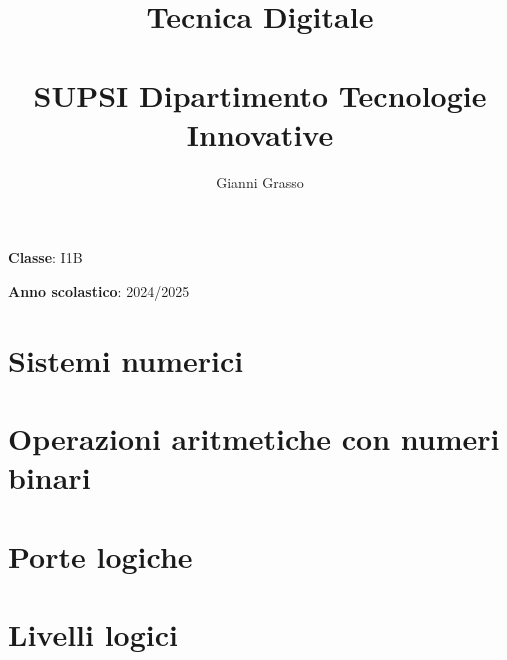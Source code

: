 \documentclass{article}
\title{
    Tecnica Digitale \\
    \phantom{}\\
    \large SUPSI Dipartimento Tecnologie Innovative
}
\author{Gianni Grasso}
\begin{document}
\maketitle
\hphantom{ }
\vspace{14.5cm}

\textbf{Classe}: I1B

\textbf{Anno scolastico}: 2024/2025
\pagebreak


\tableofcontents
\pagebreak

\section{Sistemi numerici}

\pagebreak

\section{Operazioni aritmetiche con numeri binari}

\pagebreak

\section{Porte logiche}

\pagebreak

\section{Livelli logici}

\pagebreak
\end{document}
